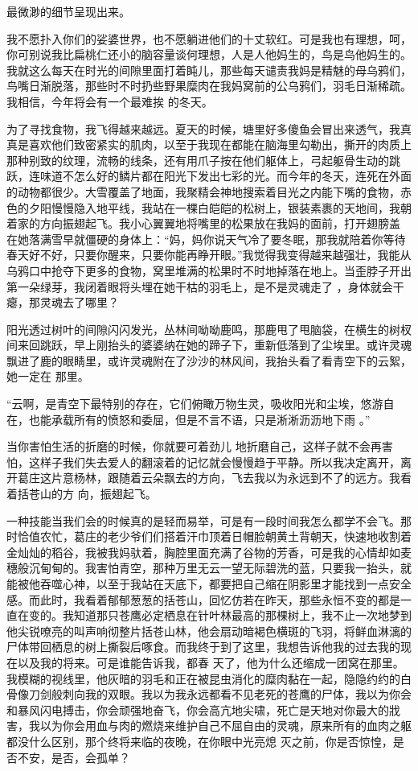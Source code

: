 \documentclass{article}
\begin{document}
\newpage
最微渺的细节呈现出来。 

我不愿扑入你们的娑婆世界，也不愿躺进他们的十丈软红。可是我也有理想，呵，你可别说我比扁桃仁还小的脑容量谈何理想，人是人他妈生的，鸟是鸟他妈生的。我就这么每天在时光的间隙里面打着盹儿，那些每天谴责我妈是精魅的母乌鸦们，鸟嘴日渐脱落，那些时不时扔些野果糜肉在我妈窝前的公乌鸦们，羽毛日渐稀疏。我相信，今年将会有一个最难挨
的冬天。 

为了寻找食物，我飞得越来越远。夏天的时候，塘里好多傻鱼会冒出来透气，我真真是喜欢他们致密紧实的肌肉，以至于我现在都能在脑海里勾勒出，撕开的肉质上那种别致的纹理，流畅的线条，还有用爪子按在他们躯体上，弓起躯骨生动的跳跃，连味道不怎么好的鳞片都在阳光下发出七彩的光。而今年的冬天，连死在外面的动物都很少。大雪覆盖了地面，我聚精会神地搜索着目光之内能下嘴的食物，赤色的夕阳慢慢隐入地平线，我站在一棵白皑皑的松树上，银装素裹的天地间，我朝着家的方向振翅起飞。我小心翼翼地将嘴里的松果放在我妈的面前，打开翅膀盖
\newpage
在她落满雪早就僵硬的身体上：“妈，妈你说天气冷了要冬眠，那我就陪着你等待春天好不好，只要你醒来，只要你能再睁开眼。”我觉得我变得越来越强壮，我能从乌鸦口中抢夺下更多的食物，窝里堆满的松果时不时地掉落在地上。当歪脖子开出第一朵绿芽，我闭着眼将头埋在她干枯的羽毛上，是不是灵魂走了
，身体就会干瘪，那灵魂去了哪里？ 

阳光透过树叶的间隙闪闪发光，丛林间呦呦鹿鸣，那鹿甩了甩脑袋，在横生的树杈间来回跳跃，早上刚抬头的婆婆纳在她的蹄子下，重新低落到了尘埃里。或许灵魂飘进了鹿的眼睛里，或许灵魂附在了沙沙的林风间，我抬头看了看青空下的云絮，她一定在
那里。 

“云啊，是青空下最特别的存在，它们俯瞰万物生灵，吸收阳光和尘埃，悠游自在，也能承载所有的愤怒和委屈，但是不言不语，只是淅淅沥沥地下雨
。” 

当你害怕生活的折磨的时候，你就要可着劲儿
\newpage
地折磨自己，这样子就不会再害怕，这样子我们失去爱人的翻滚着的记忆就会慢慢趋于平静。所以我决定离开，离开葛庄这片意杨林，跟随着云朵飘去的方向，飞去我以为永远到不了的远方。我看着括苍山的方
向，振翅起飞。 

一种技能当我们会的时候真的是轻而易举，可是有一段时间我怎么都学不会飞。那时恰值农忙，葛庄的老少爷们们搭着汗巾顶着日帽脸朝黄土背朝天，快速地收割着金灿灿的稻谷，我被我妈驮着，胸腔里面充满了谷物的芳香，可是我的心情却如麦穗般沉甸甸的。我害怕青空，那种万里无云一望无际碧洗的蓝，只要我一抬头，就能被他吞噬心神，以至于我站在天底下，都要把自己缩在阴影里才能找到一点安全感。而此时，我看着郁郁葱葱的括苍山，回忆仿若在昨天，那些永恒不变的都是一直在变的。我知道那只苍鹰必定栖息在针叶林最高的那棵树上，我不止一次地梦到他尖锐嘹亮的叫声响彻整片括苍山林，他会扇动暗褐色横斑的飞羽，将鲜血淋漓的尸体带回栖息的树上撕裂后啄食。而我终于到了这里，我想告诉他我的过去我的现在以及我的将来。可是谁能告诉我，都春
\newpage
天了，他为什么还缩成一团窝在那里。我模糊的视线里，他灰暗的羽毛和正在被昆虫消化的糜肉黏在一起，隐隐约约的白骨像刀剑般刺向我的双眼。我以为我永远都看不见老死的苍鹰的尸体，我以为你会和暴风闪电搏击，你会顽强地奋飞，你会高亢地尖啸，死亡是天地对你最大的戕害，我以为你会用血与肉的燃烧来维护自己不屈自由的灵魂，原来所有的血肉之躯都没什么区别，那个终将来临的夜晚，在你眼中光亮熄
灭之前，你是否惊惶，是否不安，是否，会孤单？ 
\end{document}
